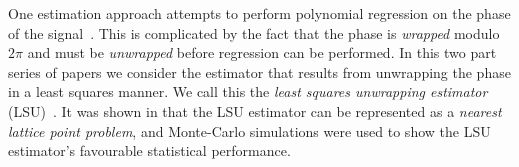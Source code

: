 \documentclass[journal]{IEEEtran}
\begin{document}
One estimation approach attempts to perform polynomial regression on the phase of the signal~\cite{Slocumb_polynomial_1994,Tretter1985,Kitchen_polyphase_unwrapping_1994,Djuric_phase_unwrap_chirp_1990,Morelande_bayes_unwrapping_2009_tsp}.  This is complicated by the fact that the phase is \emph{wrapped} modulo $2\pi$ and must be \emph{unwrapped} before regression can be performed.  In this two part series of papers we consider the estimator that results from unwrapping the phase in a least squares manner.  We call this the \emph{least squares unwrapping estimator} (LSU)~\cite{McKilliam2009asilomar_polyest_lattice, McKilliamFrequencyEstimationByPhaseUnwrapping2009}\cite[Chap. 8]{McKilliam2010thesis}.  It was shown in \cite{McKilliam2009asilomar_polyest_lattice, McKilliamFrequencyEstimationByPhaseUnwrapping2009} that the LSU estimator can be represented as a \emph{nearest lattice point problem}, and Monte-Carlo simulations were used to show the LSU estimator's favourable statistical performance. %
\end{document}
